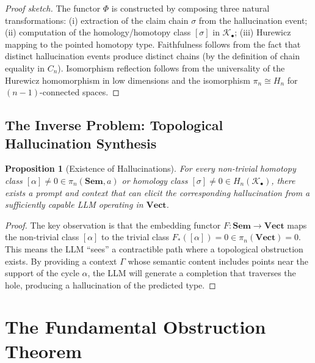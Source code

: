 \documentclass[11pt,a4paper]{article}
\theoremstyle{plain}
\newtheorem{proposition}[theorem]{Proposition}
\theoremstyle{definition}
\newcommand{\Sem}{\mathbf{Sem}}
\newcommand{\Vect}{\mathbf{Vect}}
\begin{document}
\begin{proof}[Proof sketch]
The functor $\Phi$ is constructed by composing three natural transformations: (i) extraction of the claim chain $\sigma$ from the hallucination event; (ii) computation of the homology/homotopy class $[\sigma]$ in $\mathcal{K}_\bullet$; (iii) Hurewicz mapping to the pointed homotopy type. Faithfulness follows from the fact that distinct hallucination events produce distinct chains (by the definition of chain equality in $C_n$). Isomorphism reflection follows from the universality of the Hurewicz homomorphism in low dimensions and the isomorphism $\pi_n \cong H_n$ for $(n-1)$-connected spaces.
\end{proof}

\subsection{The Inverse Problem: Topological Hallucination Synthesis}

\begin{proposition}[Existence of Hallucinations]\label{prop:existence}
For every non-trivial homotopy class $[\alpha] \neq 0 \in \pi_n(\Sem, a)$ or homology class $[\sigma] \neq 0 \in H_n(\mathcal{K}_\bullet)$, there exists a prompt and context that can elicit the corresponding hallucination from a sufficiently capable LLM operating in $\Vect$.
\end{proposition}

\begin{proof}
The key observation is that the embedding functor $F\colon \Sem \to \Vect$ maps the non-trivial class $[\alpha]$ to the trivial class $F_*([\alpha]) = 0 \in \pi_n(\Vect) = 0$. This means the LLM ``sees'' a contractible path where a topological obstruction exists. By providing a context $\Gamma$ whose semantic content includes points near the support of the cycle $\alpha$, the LLM will generate a completion that traverses the hole, producing a hallucination of the predicted type.
\end{proof}

\section{The Fundamental Obstruction Theorem}\label{sec:obstruction}
\end{document}
